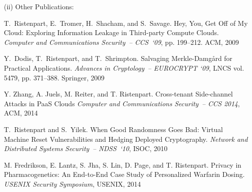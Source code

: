 \documentclass[10pt]{article}
\newcommand{\highlight}[1]{\textsf{\emph{#1}}}
\newcommand{\authorfont}[1]{\textnormal{#1}}
\newcounter{Lcount}
\newcommand{\myenum}{
\begin{list}{[\arabic{Lcount}]}
{ \usecounter{Lcount}
\setlength{\leftmargin}{4.3em}
\setlength{\labelwidth}{2em}
} }
\newcommand{\myenumend}{
\end{list} }
\begin{document}
\bigskip


\noindent (ii) Other Publications:
\myenum
\setcounter{Lcount}{\value{Lcount_saved}}

\item \label{RTSS09}
\authorfont{T.~Ristenpart, E.~Tromer, H.~Shacham, and S.~Savage}.
Hey, You, Get Off of My Cloud: Exploring Information Leakage in
  Third-party Compute Clouds.
\emph{Computer and Communications Security~-- CCS~`09}, pp. 199--212. ACM, 2009

\item \label{DRS09}
\authorfont{Y.~Dodis, T.~Ristenpart, and T.~Shrimpton}.
Salvaging Merkle-Damg{\aa}rd for Practical Applications.
\emph{Advances in Cryptology~-- EUROCRYPT `09}, LNCS
  vol. 5479, pp. 371--388. Springer, 2009


\item \label{ZJRR14}
\authorfont{Y. Zhang, A. Juels, M. Reiter, and T. Ristenpart}.
Cross-tenant Side-channel Attacks in PaaS Clouds
\emph{Computer and Communications Security~-- CCS 2014}, ACM, 2014


\item \label{RY10}
\authorfont{T.~Ristenpart and S.~Yilek}.
When Good Randomness Goes Bad: Virtual Machine Reset Vulnerabilities
  and Hedging Deployed Cryptography.
\emph{Network and Distributed Systems Security~-- NDSS~`10}, ISOC,
  2010



\item \label{FLJLPR14}
\authorfont{M. Fredrikson, E. Lantz, S. Jha, S. Lin, D. Page, and T.
Ristenpart}.
Privacy in Pharmacogenetics: An End-to-End Case Study of Personalized Warfarin Dosing.
\emph{USENIX Security Symposium}, USENIX, 2014

\myenumend


%



%
\bigskip
\end{document}

